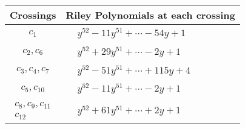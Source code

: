 \documentclass[1p]{elsarticle_modified}
\theoremstyle{definition}
\begin{document}
\begin{tabular}{m{50pt}|m{274pt}}
Crossings & \hspace{64pt}Riley Polynomials at each crossing \\
\hline $$\begin{aligned}c_{1}\end{aligned}$$&$\begin{aligned}
&y^{52}-11 y^{51}+\cdots-54 y+1
\end{aligned}$\\
\hline $$\begin{aligned}c_{2},c_{6}\end{aligned}$$&$\begin{aligned}
&y^{52}+29 y^{51}+\cdots-2 y+1
\end{aligned}$\\
\hline $$\begin{aligned}c_{3},c_{4},c_{7}\end{aligned}$$&$\begin{aligned}
&y^{52}-51 y^{51}+\cdots+115 y+4
\end{aligned}$\\
\hline $$\begin{aligned}c_{5},c_{10}\end{aligned}$$&$\begin{aligned}
&y^{52}-11 y^{51}+\cdots-2 y+1
\end{aligned}$\\
\hline $$\begin{aligned}c_{8},c_{9},c_{11}\\c_{12}\end{aligned}$$&$\begin{aligned}
&y^{52}+61 y^{51}+\cdots+2 y+1
\end{aligned}$\\
\hline
\end{tabular}
\vskip 2pc
\end{document}
